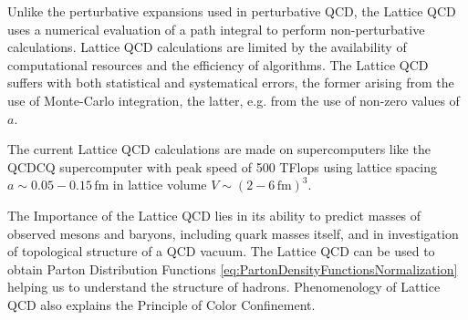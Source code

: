 Unlike the perturbative expansions used in perturbative QCD, the Lattice QCD
uses a numerical evaluation of a path integral to perform non-perturbative
calculations. 
Lattice QCD calculations are limited by the availability of computational
resources and the efficiency of algorithms. The Lattice QCD suffers with both
statistical and systematical errors, the former arising from the use of
Monte-Carlo integration, the latter, e.g. from the use of non-zero values of
$a$.

The current Lattice QCD calculations are made on supercomputers like the QCDCQ
supercomputer \cite{SuperComputer} with peak speed of 500 TFlops using lattice
spacing $a \sim 0.05 - 0.15 \, \text{fm}$ in lattice volume $V \sim (2 - 6
\,\text{fm} )^3$.

The Importance of the Lattice QCD lies in its ability to predict masses of observed
mesons and baryons, including quark masses itself, and in investigation of
topological structure of a QCD vacuum.  The Lattice QCD can be used to obtain
Parton Distribution Functions
\eqref{eq:PartonDensityFunctionsNormalization} helping us to understand the
structure of hadrons. Phenomenology of Lattice QCD also explains the Principle of Color
Confinement. 


